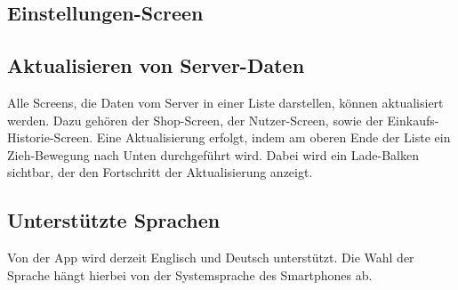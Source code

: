 

\subsection{Einstellungen-Screen} \label{subsec:settings-screen}

\subsection{Aktualisieren von Server-Daten}

Alle Screens, die Daten vom Server in einer Liste darstellen, können aktualisiert werden.
Dazu gehören der Shop-Screen, der Nutzer-Screen, sowie der Einkaufs-Historie-Screen.
Eine Aktualisierung erfolgt, indem am oberen Ende der Liste ein Zieh-Bewegung nach Unten durchgeführt wird.
Dabei wird ein Lade-Balken sichtbar, der den Fortschritt der Aktualisierung anzeigt.

\subsection{Unterstützte Sprachen} \label{subsec:languages}
Von der App wird derzeit Englisch und Deutsch unterstützt. Die Wahl der Sprache hängt hierbei von der Systemsprache des Smartphones ab.
